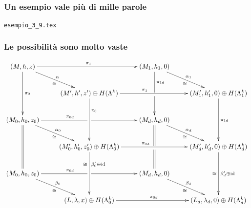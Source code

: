 \documentclass[svgnames,%
	ucs,%
	pdftex]{guitbeamer}
\begin{document}
\begin{frame}
  \frametitle{Un esempio vale pi\`u di mille parole}
	\begin{center}
		\alert{\texttt{esempio\_3\_9.tex}}
	\end{center}
\end{frame}
\begin{frame}
  \frametitle{Le possibilit\`a sono molto vaste}
	\tiny\vspace{-.08\textheight}
	\[\xymatrix{
	(M,h,z) \ar[dd]^{\pi_0} \ar[dr]^\alpha_\cong \ar[rr]^{\pi_1}
	&& (M_1,h_1,0) \ar'[d]^-{\pi_{1d}}[dd] \ar[dr]^{\alpha_1}_\cong
	\\
	& (M',h',z')\oplus H(\Lambda^k) \ar[dd]^<(.25){\pi_0} \ar[rr]^<(.25){\pi_1}
	&& (M'_1,h'_1,0)\oplus H(\Lambda_1^k) \ar[dd]^{\pi_{1d}}
	\\
	(M_0,h_0,z_0) \ar@{=}[dd] \ar[dr]^{\alpha_0}_\cong \ar'[r]^<(.6){\pi_{0d}}[rr]
	&& (M_d,h_d,0) \ar@{=}'[d][dd] \ar[dr]^{\alpha_d}_\cong
	\\
	& (M'_0,h'_0,z'_0)\oplus H(\Lambda_0^k) \ar[dd]^<(.25){\beta'_0\oplus\text{id}}_<(.25)\cong
	\ar[rr]^<(.25){\pi_{0d}}
	&& (M'_d,h'_d,0)\oplus H(\Lambda_d^k) \ar[dd]^{\beta'_d\oplus\text{id}}_\cong
	\\
	(M_0,h_0,z_0) \ar[dr]^{\beta_0}_\cong \ar'[r]^<(.6){\pi_{0d}}[rr]
	&& (M_d,h_d,0) \ar[dr]^{\beta_d}_\cong
	\\
	& (L,\lambda,x)\oplus H(\Lambda_0^k) \ar[rr]^{\pi_{0d}}
	&& (L_d,\lambda_d,0)\oplus H(\Lambda_d^k)
	}\]
\end{frame}
\end{document}
